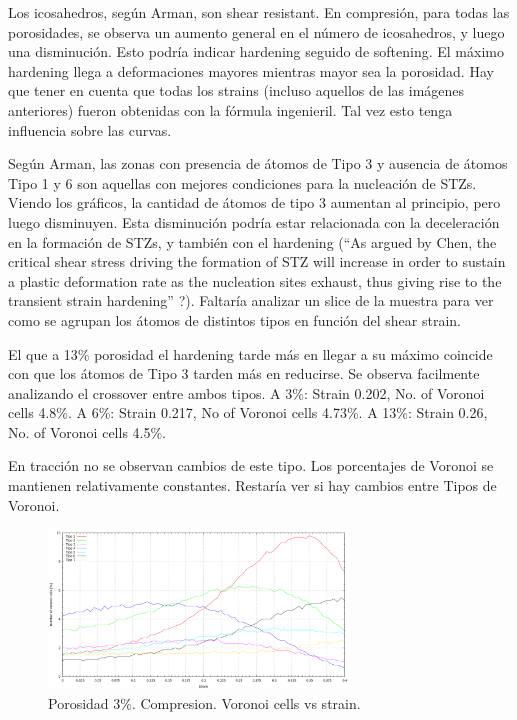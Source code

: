\documentclass[10pt, oneside]{article} %
\begin{document}
Los icosahedros, según Arman, son shear resistant. En compresión, para todas las porosidades, se observa un aumento general en el número de icosahedros, y luego una disminución. Esto podría indicar hardening seguido de softening. El máximo hardening llega a deformaciones mayores mientras mayor sea la porosidad. Hay que tener en cuenta que todas los strains (incluso aquellos de las imágenes anteriores) fueron obtenidas con la fórmula ingenieril. Tal vez esto tenga influencia sobre las curvas.

Según Arman, las zonas con presencia de átomos de Tipo 3 y ausencia de átomos Tipo 1 y 6 son aquellas con mejores condiciones para la nucleación de STZs. Viendo los gráficos, la cantidad de átomos de tipo 3 aumentan al principio, pero luego disminuyen. Esta disminución podría estar relacionada con la deceleración en la formación de STZs, y también con el hardening (“As argued by Chen, the critical shear stress driving the formation of STZ will increase in order to sustain a plastic deformation rate as the nucleation sites exhaust, thus giving rise to the transient strain hardening” ?). Faltaría analizar un slice de la muestra para ver como se agrupan los átomos de distintos tipos en función del shear strain.

El que a 13\% porosidad el hardening tarde más en llegar a su máximo coincide con que los átomos de Tipo 3 tarden más en reducirse. Se observa facilmente analizando el crossover entre ambos tipos. A 3\%: Strain 0.202, No. of Voronoi cells 4.8\%. A 6\%: Strain 0.217, No of Voronoi cells 4.73\%. A 13\%: Strain 0.26, No. of Voronoi cells 4.5\%.

En tracción no se observan cambios de este tipo. Los porcentajes de Voronoi se mantienen relativamente constantes. Restaría ver si hay cambios entre Tipos de Voronoi.

\begin{figure}[H]
\centering
\includegraphics[width=8cm]{Figures/Porosidad_3_noVoronoi_strain.png}
\caption{Porosidad 3\%. Compresion. Voronoi cells vs strain.}
\end{figure}
\end{document}
